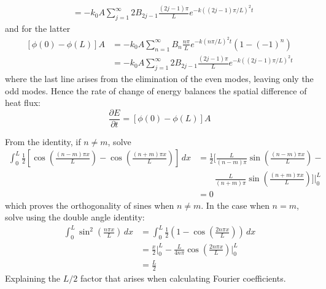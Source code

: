 \documentclass[a4paper]{article}
\begin{document}
\begin{enumerate}[label=(\alph*)]
\begin{align*}
					      & = -k_{0} A \sum^{\infty}_{j=1} 2B_{2j-1}\frac{\!\left( 2j-1 \right)\pi}{L}e^{-k \!\left( \!\left( 2j-1 \right)\pi / L \right)^{2}t}
	\end{align*}
	and for the latter
	\begin{align*}
		\!\left[ \phi \!\left( 0 \right) - \phi \!\left( L \right) \right]A & = -k_{0}A \sum^{\infty}_{n=1} B_{n}\frac{n \pi}{L}e^{-k \!\left( n \pi / L \right)^{2}t}\!\left( 1 - \!\left( -1 \right)^{n} \right) \\ 
		 & = -k_{0} A \sum^{\infty}_{j=1} 2B_{2j-1}\frac{\!\left( 2j-1 \right)\pi}{L}e^{-k \!\left( \!\left( 2j-1 \right)\pi / L \right)^{2}t}
	\end{align*}
	where the last line arises from the elimination of the even modes, leaving only the odd modes. Hence the rate of change of energy balances the spatial difference of heat flux:
	\[
		\frac{\partial E}{\partial t} = \!\left[ \phi \!\left( 0 \right) - \phi \!\left( L \right) \right]A
	\]
\end{enumerate}

From the identity, if \( n \neq m \), solve
{\footnotesize
\begin{align*}
	\int^{L}_{0} \frac{1}{2}\!\left[ \cos\!\left(\frac{\!\left( n - m \right)\pi x}{L}\right) - \cos\!\left(\frac{\!\left( n + m \right)\pi x}{L}\right) \right] \, dx & = \frac{1}{2}\!\biggl[ \frac{L}{\!\left( n - m \right)\pi}\sin\!\left(\frac{\!\left( n - m \right)\pi x}{L}\right) - \\ 
																					   & \qquad \frac{L}{\!\left( n + m \right)\pi}\sin\!\left(\frac{\!\left( n + m \right)\pi x}{L}\right) \biggr]\Big|^{L}_{0} \\
	 & = 0 
\end{align*}}
which proves the orthogonality of sines when \( n \neq m \). In the case when \( n = m \), solve using the double angle identity:
\begin{align*}
	\int^{L}_{0} \sin^{2}\!\left(\frac{n \pi x}{L}\right) \, dx & = \int^{L}_{0} \frac{1}{2}\!\left( 1 - \cos\!\left(\frac{2n \pi x}{L}\right) \right) \, dx \\
	 & = \frac{x}{2}\Big|^{L}_{0} - \frac{L}{4n \pi}\cos\!\left(\frac{2n \pi x}{L}\right)\Big|^{L}_{0} \\ 
	 & = \frac{L}{2}
\end{align*}
Explaining the \( L / 2 \) factor that arises when calculating Fourier coefficients.
\end{document}
